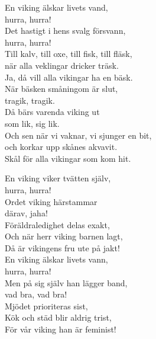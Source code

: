 \documentclass[a6paper, 10pt, twoside]{article}
\begin{document}
\newpage
\noindent
\begin{center}
\end{center}
\begin{lyrics}
En viking älskar livets vand, \\
hurra, hurra! \\
Det hastigt i hens svalg försvann, \\
hurra, hurra! \\
Till kalv, till oxe, till fisk, till fläsk, \\
när alla veklingar dricker träsk. \\
Ja, då vill alla vikingar ha en bäsk. 
\vspace{5pt}\\
När bäsken småningom är slut, \\
tragik, tragik. \\
Då bärs varenda viking ut \\
som lik, sig lik. \\
Och sen när vi vaknar, vi sjunger en bit, \\
och korkar upp skånes akvavit. \\
Skål för alla vikingar som kom hit. 
\end{lyrics}
\newpage\begin{center}
\end{center}
\begin{lyrics}
En viking viker tvätten själv,\\
hurra, hurra!\\ 
Ordet viking härstammar\\ 
därav, jaha!\\ 
Föräldraledighet delas exakt, \\
Och när herr viking barnen lagt,\\ 
Då är vikingens fru ute på jakt! 
\vspace{5pt}\\
En viking älskar livets vann,\\
hurra, hurra! \\
Men på sig själv han lägger band,\\
vad bra, vad bra! \\
Mjödet prioriteras sist,\\
Kök och städ blir aldrig trist,\\ 
För vår viking han är feminist! 
\end{lyrics}
\end{document}

